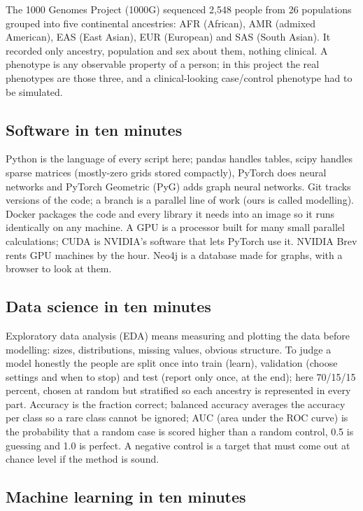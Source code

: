 \documentclass[11pt,a4paper]{article}
\begin{document}
The 1000 Genomes Project (1000G) sequenced 2,548 people from 26 populations grouped into five continental ancestries: AFR (African), AMR (admixed American), EAS (East Asian), EUR (European) and SAS (South Asian). It recorded only ancestry, population and sex about them, nothing clinical. A phenotype is any observable property of a person; in this project the real phenotypes are those three, and a clinical-looking case/control phenotype had to be simulated.

\subsection{Software in ten minutes}

Python is the language of every script here; pandas handles tables, scipy handles sparse matrices (mostly-zero grids stored compactly), PyTorch does neural networks and PyTorch Geometric (PyG) adds graph neural networks. Git tracks versions of the code; a branch is a parallel line of work (ours is called modelling). Docker packages the code and every library it needs into an image so it runs identically on any machine. A GPU is a processor built for many small parallel calculations; CUDA is NVIDIA's software that lets PyTorch use it. NVIDIA Brev rents GPU machines by the hour. Neo4j is a database made for graphs, with a browser to look at them.

\subsection{Data science in ten minutes}

Exploratory data analysis (EDA) means measuring and plotting the data before modelling: sizes, distributions, missing values, obvious structure. To judge a model honestly the people are split once into train (learn), validation (choose settings and when to stop) and test (report only once, at the end); here 70/15/15 percent, chosen at random but stratified so each ancestry is represented in every part. Accuracy is the fraction correct; balanced accuracy averages the accuracy per class so a rare class cannot be ignored; AUC (area under the ROC curve) is the probability that a random case is scored higher than a random control, 0.5 is guessing and 1.0 is perfect. A negative control is a target that must come out at chance level if the method is sound.

\subsection{Machine learning in ten minutes}
\end{document}
